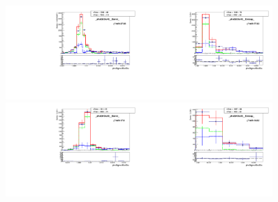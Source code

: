 \begin{figure}[htb]
  \begin{center}
   \includegraphics[width=0.45\textwidth]{../figs/figs_v11/MUON_WGamma/TemplateFits/c_TEMPL_SIHIH_UNblind__phoEt35to45__Barrel__RooFit.pdf}\includegraphics[width=0.45\textwidth]{../figs/figs_v11/MUON_WGamma/TemplateFits/c_TEMPL_SIHIH_UNblind__phoEt35to45__Endcap__RooFit.pdf}\\
   \includegraphics[width=0.45\textwidth]{../figs/figs_v11/MUON_WGamma/TemplateFits/c_TEMPL_SIHIH_UNblind__phoEt45to55__Barrel__RooFit.pdf}\includegraphics[width=0.45\textwidth]{../figs/figs_v11/MUON_WGamma/TemplateFits/c_TEMPL_SIHIH_UNblind__phoEt45to55__Endcap__RooFit.pdf}\\

\end{center}
\end{figure}
